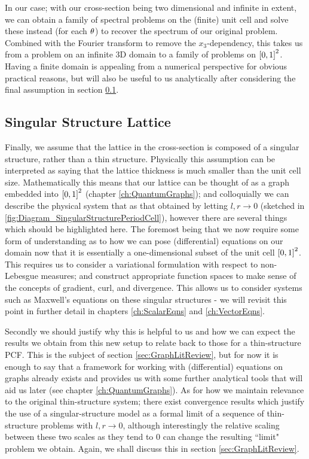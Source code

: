 In our case; with our cross-section being two dimensional and infinite in extent, we can obtain a family of spectral problems on the (finite) unit cell and solve these instead (for each $\theta$) to recover the spectrum of our original problem.
Combined with the Fourier transform to remove the $x_3$-dependency, this takes us from a problem on an infinite 3D domain to a family of problems on $\left[ 0,1 \right]^2$.
Having a finite domain is appealing from a numerical perspective for obvious practical reasons, but will also be useful to us analytically after considering the final assumption in section \ref{sec:ModellingAssumption3}.

\subsection{Singular Structure Lattice} \label{sec:ModellingAssumption3}
Finally, we assume that the lattice in the cross-section is composed of a singular structure, rather than a thin structure.
Physically this assumption can be interpreted as saying that the lattice thickness is much smaller than the unit cell size.
Mathematically this means that our lattice can be thought of as a graph embedded into $\left[ 0,1 \right]^2$ (chapter \ref{ch:QuantumGraphs}); and colloquially we can describe the physical system that as that obtained by letting $l,r\rightarrow0$ (sketched in \ref{fig:Diagram_SingularStructurePeriodCell}), however there are several things which should be highlighted here.
The foremost being that we now require some form of understanding as to how we can pose (differential) equations on our domain now that it is essentially a one-dimensional subset of the unit cell $\left[ 0,1 \right]^2$.
This requires us to consider a variational formulation with respect to non-Lebesgue measures; and construct appropriate function spaces to make sense of the concepts of gradient, curl, and divergence.
This allows us to consider systems such as Maxwell's equations on these singular structures - we will revisit this point in further detail in chapters \ref{ch:ScalarEqns} and \ref{ch:VectorEqns}. \newline

Secondly we should justify why this is helpful to us and how we can expect the results we obtain from this new setup to relate back to those for a thin-structure PCF.
This is the subject of section \ref{sec:GraphLitReview}, but for now it is enough to say that a framework for working with (differential) equations on graphs already exists and provides us with some further analytical tools that will aid us later (see chapter \ref{ch:QuantumGraphs}).
As for how we maintain relevance to the original thin-structure system; there exist convergence results which justify the use of a singular-structure model as a formal limit of a sequence of thin-structure problems with $l,r\rightarrow0$, although interestingly the relative scaling between these two scales as they tend to 0 can change the resulting ``limit" problem we obtain.
Again, we shall discuss this in section \ref{sec:GraphLitReview}.

